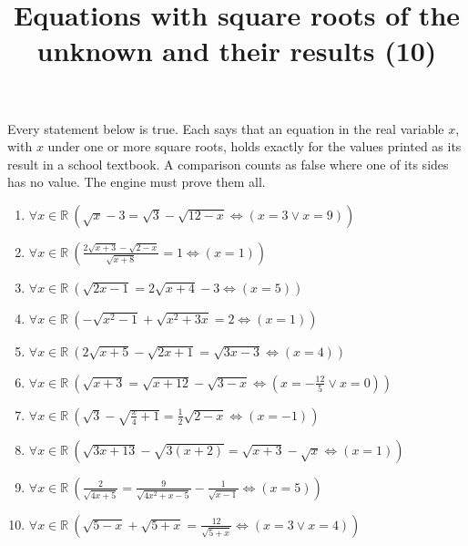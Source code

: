 \documentclass[11pt,a4paper]{article}
\title{Equations with square roots of the unknown and their results (10)}
\author{}
\date{}
\begin{document}
\maketitle
Every statement below is true. Each says that an equation in the real variable $x$, with $x$ under one or more square roots, holds exactly for the values printed as its result in a school textbook. A comparison counts as false where one of its sides has no value. The engine must prove them all.

\begin{enumerate}
\item $\displaystyle \forall x \in \mathbb{R}\ \left( \sqrt{x} - 3 = \sqrt{3} - \sqrt{12 - x} \iff \left( x = 3 \lor x = 9 \right) \right)$
\item $\displaystyle \forall x \in \mathbb{R}\ \left( \frac{2\sqrt{x + 3} - \sqrt{2 - x}}{\sqrt{x + 8}} = 1 \iff \left( x = 1 \right) \right)$
\item $\displaystyle \forall x \in \mathbb{R}\ \left( \sqrt{2x - 1} = 2\sqrt{x + 4} - 3 \iff \left( x = 5 \right) \right)$
\item $\displaystyle \forall x \in \mathbb{R}\ \left( -\sqrt{x^{2} - 1} + \sqrt{x^{2} + 3x} = 2 \iff \left( x = 1 \right) \right)$
\item $\displaystyle \forall x \in \mathbb{R}\ \left( 2\sqrt{x + 5} - \sqrt{2x + 1} = \sqrt{3x - 3} \iff \left( x = 4 \right) \right)$
\item $\displaystyle \forall x \in \mathbb{R}\ \left( \sqrt{x + 3} = \sqrt{x + 12} - \sqrt{3 - x} \iff \left( x = -\frac{12}{5} \lor x = 0 \right) \right)$
\item $\displaystyle \forall x \in \mathbb{R}\ \left( \sqrt{3} - \sqrt{\frac{x}{4} + 1} = \frac{1}{2}\sqrt{2 - x} \iff \left( x = -1 \right) \right)$
\item $\displaystyle \forall x \in \mathbb{R}\ \left( \sqrt{3x + 13} - \sqrt{3(x + 2)} = \sqrt{x + 3} - \sqrt{x} \iff \left( x = 1 \right) \right)$
\item $\displaystyle \forall x \in \mathbb{R}\ \left( \frac{2}{\sqrt{4x + 5}} = \frac{9}{\sqrt{4x^{2} + x - 5}} - \frac{1}{\sqrt{x - 1}} \iff \left( x = 5 \right) \right)$
\item $\displaystyle \forall x \in \mathbb{R}\ \left( \sqrt{5 - x} + \sqrt{5 + x} = \frac{12}{\sqrt{5 + x}} \iff \left( x = 3 \lor x = 4 \right) \right)$
\end{enumerate}
\end{document}
